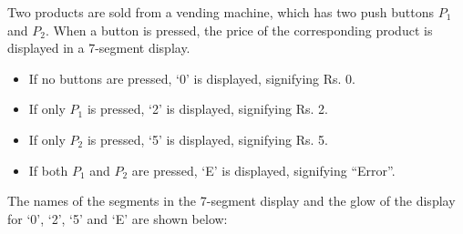 \documentclass[a4paper,12pt]{article}
\begin{document}
Two products are sold from a vending machine, which has two push buttons $P_1$ and $P_2$.  
When a button is pressed, the price of the corresponding product is displayed in a 7-segment display.

\begin{itemize}
    \item If no buttons are pressed, ‘0’ is displayed, signifying Rs. 0.
    \item If only $P_1$ is pressed, ‘2’ is displayed, signifying Rs. 2.
    \item If only $P_2$ is pressed, ‘5’ is displayed, signifying Rs. 5.
    \item If both $P_1$ and $P_2$ are pressed, ‘E’ is displayed, signifying “Error”.
\end{itemize}

\vspace{0.5em}

The names of the segments in the 7-segment display and the glow of the display for ‘0’, ‘2’, ‘5’ and ‘E’ are shown below:

\vspace{0.5cm}


\newcommand{\segmenta}{\draw[very thick] (0.4,2.6) -- (1.3,2.6);}
\newcommand{\segmentb}{\draw[very thick] (1.3,2.5) -- (1.3,1.6);}
\newcommand{\segmentc}{\draw[very thick] (1.3,1.4) -- (1.3,0.5);}
\newcommand{\segmentd}{\draw[very thick] (0.4,0.4) -- (1.3,0.4);}
\newcommand{\segmente}{\draw[very thick] (0.3,1.4) -- (0.3,0.4);}
\newcommand{\segmentf}{\draw[very thick] (0.3,2.6) -- (0.3,1.6);}
\newcommand{\segmentg}{\draw[very thick] (0.3,1.5) -- (1.2,1.5);}

\newcommand{\segmentaoff}{\draw[gray!30] (0.3,2.7) -- (1.1,2.6);}
\newcommand{\segmentboff}{\draw[gray!30] (1.1,2.6) -- (1.1,1.6);}
\newcommand{\segmentcoff}{\draw[gray!30] (1.1,1.4) -- (1.1,0.4);}
\newcommand{\segmentdoff}{\draw[gray!30] (0.5,0.4) -- (1.1,0.4);}
\newcommand{\segmenteoff}{\draw[gray!30] (0.3,1.4) -- (0.3,0.4);}
\newcommand{\segmentfoff}{\draw[gray!30] (0.3,2.6) -- (0.3,1.6);}
\newcommand{\segmentgoff}{\draw[gray!30] (0.3,1.5) -- (1.1,1.5);}

\newcommand{\digitseven}[8]{%
  \begin{scope}[xshift=#8 cm]
    \ifnum#1=1 \segmenta \else \segmentaoff \fi
    \ifnum#2=1 \segmentb \else \segmentboff \fi
    \ifnum#3=1 \segmentc \else \segmentcoff \fi
    \ifnum#4=1 \segmentd \else \segmentdoff \fi
    \ifnum#5=1 \segmente \else \segmenteoff \fi
    \ifnum#6=1 \segmentf \else \segmentfoff \fi
    \ifnum#7=1 \segmentg \else \segmentgoff \fi
  \end{scope}
}
\end{document}
